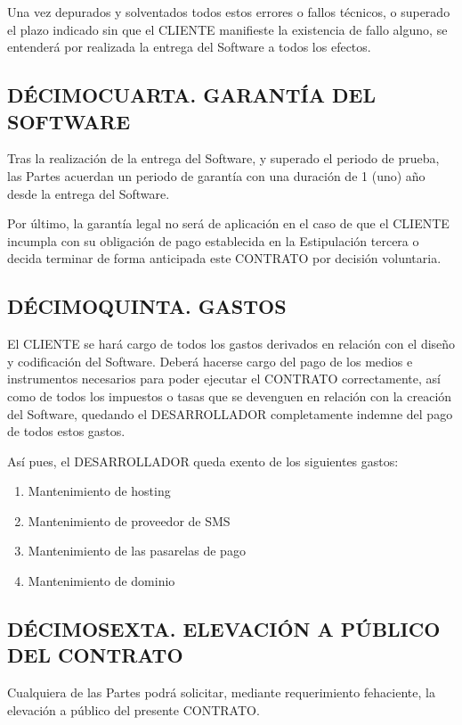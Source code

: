 \documentclass[a4paper,11pt]{report}
\begin{document}
	Una vez depurados y solventados todos estos errores o fallos técnicos, o
	superado el plazo indicado sin que el CLIENTE manifieste la existencia
	de fallo alguno, se entenderá por realizada la entrega del Software a
	todos los efectos.

	\subsection*{DÉCIMOCUARTA. GARANTÍA DEL SOFTWARE}

	Tras la realización de la entrega del Software, y superado el periodo de
	prueba, las Partes acuerdan un periodo de garantía con una duración
	de 1 (uno) año desde la entrega del Software.

	Por último, la garantía legal no será de aplicación en el caso de que el
	CLIENTE incumpla con su obligación de pago establecida en la
	Estipulación tercera o decida terminar de forma anticipada este CONTRATO
	por decisión voluntaria.

	\subsection*{DÉCIMOQUINTA. GASTOS}

	El CLIENTE se hará cargo de todos los gastos derivados en relación
	con el diseño y codificación del Software. Deberá hacerse cargo del pago
	de los medios e instrumentos necesarios para poder ejecutar el CONTRATO
	correctamente, así como de todos los impuestos o tasas que se devenguen
	en relación con la creación del Software, quedando el DESARROLLADOR
	completamente indemne del pago de todos estos gastos.

	Así pues, el DESARROLLADOR queda exento de los siguientes gastos:

	\begin{enumerate}
		\item Mantenimiento de hosting
		\item Mantenimiento de proveedor de SMS
		\item Mantenimiento de las pasarelas de pago
		\item Mantenimiento de dominio
	\end{enumerate}

	\subsection*{DÉCIMOSEXTA. ELEVACIÓN A PÚBLICO DEL CONTRATO}

	Cualquiera de las Partes podrá solicitar, mediante requerimiento
	fehaciente, la elevación a público del presente CONTRATO.
\end{document}
